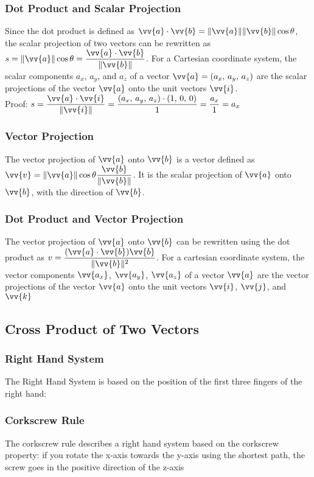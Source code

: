 \documentclass{article}
\newcommand{\mv}[1]{
	\lVert\vv{#1}\rVert
}
\begin{document}
	\subsubsection{Dot Product and Scalar Projection}
	Since the dot product is defined as $\vv{a}\cdot\vv{b}=\mv{a}\mv{b}\cos\theta$, the scalar projection of two vectors can be rewritten as $s=\mv{a}\cos\theta=\dfrac{\vv{a}\cdot\vv{b}}{\mv{b}}$. For a Cartesian coordinate system, the scalar components $a_x$, $a_y$, and $a_z$ of a vector $\vv{a}=(a_x,\,a_y,\,a_z)$ are the scalar projections of the vector $\vv{a}$ onto the unit vectors $\vv{i}$.\\Proof: $s=\dfrac{\vv{a}\cdot\vv{i}}{\mv{i}}=\dfrac{(a_x,\,a_y,\,a_z)\cdot(1,\,0,\,0)}{1}=\dfrac{a_x}{1}=a_x$
	\subsubsection{Vector Projection}
	The vector projection of $\vv{a}$ onto $\vv{b}$ is a vector defined as $\vv{v}=\mv{a}\cos\theta\dfrac{\vv{b}}{\mv{b}}$. It is the scalar projection of $\vv{a}$ onto $\vv{b}$, with the direction of $\vv{b}$.
	\subsubsection{Dot Product and Vector Projection}
	The vector projection of $\vv{a}$ onto $\vv{b}$ can be rewritten using the dot product as $v=\dfrac{(\vv{a}\cdot\vv{b})\vv{b}}{\mv{b}^2}$. For a cartesian coordinate system, the vector components $\vv{a_x}$, $\vv{a_y}$, $\vv{a_z}$ of a vector $\vv{a}$ are the vector projections of the vector $\vv{a}$ onto the unit vectors $\vv{i}$, $\vv{j}$, and $\vv{k}$
	\subsection{Cross Product of Two Vectors}
	\subsubsection{Right Hand System}
	The Right Hand System is based on the position of the first three fingers of the right hand: %
	\subsubsection{Corkscrew Rule}
	The corkscrew rule describes a right hand system based on the corkscrew property: if you rotate the x-axis towards the y-axis using the shortest path, the screw goes in the positive direction of the z-axis
\end{document}
